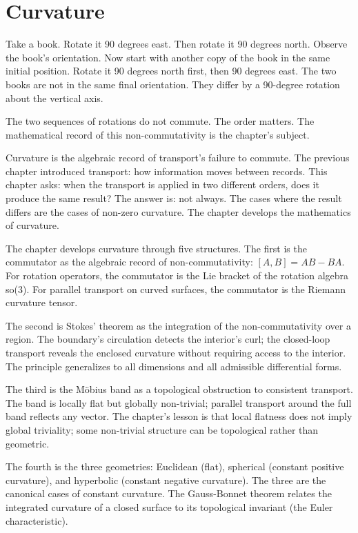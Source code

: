 \chapter{Curvature}
\label{chap:curvature}


\begin{chapteressay}

Take a book. Rotate it 90 degrees east. Then rotate it 90 degrees
north. Observe the book's orientation. Now start with another copy
of the book in the same initial position. Rotate it 90 degrees north
first, then 90 degrees east. The two books are not in the same final
orientation. They differ by a 90-degree rotation about the vertical
axis.

The two sequences of rotations do not commute. The order matters. The
mathematical record of this non-commutativity is the chapter's
subject.

Curvature is the algebraic record of transport's failure to commute.
The previous chapter introduced transport: how information moves
between records. This chapter asks: when the transport is applied
in two different orders, does it produce the same result? The
answer is: not always. The cases where the result differs are
the cases of non-zero curvature. The chapter develops the
mathematics of curvature.

The chapter develops curvature through five structures. The first
is the commutator as the algebraic record of non-commutativity:
$[A, B] = AB - BA$. For rotation operators, the commutator is
the Lie bracket of the rotation algebra so(3). For parallel
transport on curved surfaces, the commutator is the Riemann
curvature tensor.

The second is Stokes' theorem as the integration of the
non-commutativity over a region. The boundary's circulation
detects the interior's curl; the closed-loop transport reveals
the enclosed curvature without requiring access to the
interior. The principle generalizes to all dimensions and all
admissible differential forms.

The third is the M\"obius band as a topological obstruction to
consistent transport. The band is locally flat but globally
non-trivial; parallel transport around the full band reflects
any vector. The chapter's lesson is that local flatness does
not imply global triviality; some non-trivial structure can be
topological rather than geometric.

The fourth is the three geometries: Euclidean (flat), spherical
(constant positive curvature), and hyperbolic (constant negative
curvature). The three are the canonical cases of constant
curvature. The Gauss-Bonnet theorem relates the integrated
curvature of a closed surface to its topological invariant
(the Euler characteristic).


\end{chapteressay}
